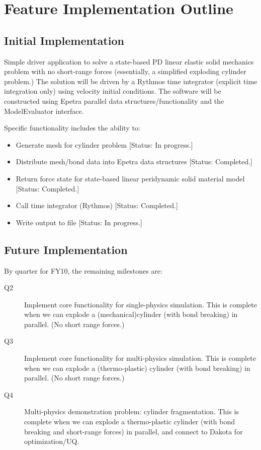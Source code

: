 \documentclass[10pt]{article}
\theoremstyle{plain}
\theoremstyle{definition}
\begin{document}
\appendix
\section{Feature Implementation Outline}

\subsection{Initial Implementation}

Simple driver application to solve a state-based PD linear elastic solid mechanics problem with no short-range forces (essentially, a simplified exploding cylinder problem.) The solution will be driven by a Rythmos time integrator (explicit time integration only) using velocity initial conditions.  The software will be constructed using Epetra parallel data structures/functionality and the ModelEvaluator interface.

Specific functionality includes the ability to:
\begin{itemize}
  \item Generate mesh for cylinder problem [Status: In progress.]
  \item Distribute mesh/bond data into Epetra data structures [Status: Completed.]
  \item Return force state for state-based linear peridynamic solid material model [Status: Completed.]
  \item Call time integrator (Rythmos) [Status: Completed.]
  \item Write output to file [Status: In progress.]
\end{itemize}

\subsection{Future Implementation}

By quarter for FY10, the remaining milestones are:

\begin{description}
  \item[Q2] Implement core functionality for single-physics simulation. This is complete when we can explode a (mechanical)cylinder (with bond breaking) in parallel. (No short range forces.)
  \item[Q3] Implement core functionality for multi-physics simulation. This is complete when we can explode a (thermo-plastic) cylinder (with bond breaking) in parallel. (No short range forces.)
  \item[Q4] Multi-physics demonstration problem: cylinder fragmentation. This is complete when we can explode a thermo-plastic cylinder (with bond breaking and short-range forces) in parallel, and connect to Dakota for optimization/UQ.
\end{description}
\end{document}
